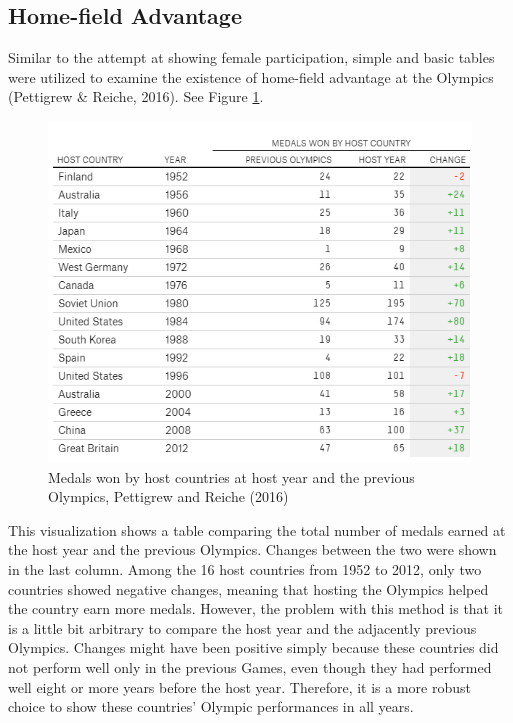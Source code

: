 \documentclass[
]{article}
\begin{document}
\hypertarget{lit-homefield}{%
\subsection{Home-field Advantage}\label{lit-homefield}}

Similar to the attempt at showing female participation, simple and basic tables were utilized to examine the existence of home-field advantage at the Olympics (Pettigrew \& Reiche, 2016). See Figure \ref{fig:figure04}.

\begin{figure}

{\centering \includegraphics[width=0.85\linewidth]{static/pics/2-1} 

}

\caption{Medals won by host countries at host year and the previous Olympics, Pettigrew and Reiche (2016)}\label{fig:figure04}
\end{figure}

This visualization shows a table comparing the total number of medals earned at the host year and the previous Olympics. Changes between the two were shown in the last column. Among the 16 host countries from 1952 to 2012, only two countries showed negative changes, meaning that hosting the Olympics helped the country earn more medals. However, the problem with this method is that it is a little bit arbitrary to compare the host year and the adjacently previous Olympics. Changes might have been positive simply because these countries did not perform well only in the previous Games, even though they had performed well eight or more years before the host year. Therefore, it is a more robust choice to show these countries' Olympic performances in all years.
\end{document}
